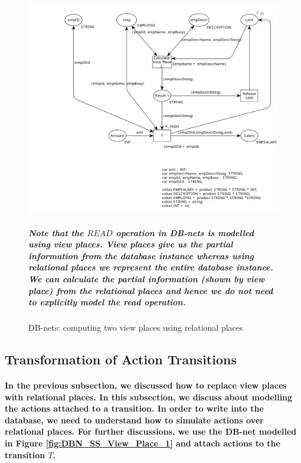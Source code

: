 \begin{figure}[!htbp]
	\centering
	\includegraphics[scale = 0.40]{DBN_SS_Relational_Place_2.pdf}
	\caption{DB-nets: computing two view places using relational places}
	\label{fig:DBN_SS_Relational_Place_2}
	
\subparagraph*{\textnormal{Note that the $\mathit{READ}$ operation in DB-nets is modelled using view places. View places give us the partial information from the database instance whereas using relational places we represent the entire database instance. We can calculate the partial information (shown by view place) from the relational places and hence we do not need to explicitly model the read operation.}}
\end{figure}

\subsection{Transformation of Action Transitions}
\label{subsec:DBN_SS_Transformation_Action_Transitions}
\paragraph*{\textnormal{In the previous subsection, we discussed how to replace view places with relational places. In this subsection, we discuss about modelling the actions attached to a transition. In order to write into the database, we need to understand how to simulate actions over relational places. For further discussions, we use the DB-net modelled in Figure \ref{fig:DBN_SS_View_Place_1} and attach actions to the transition $\mathit{T}$.}}

